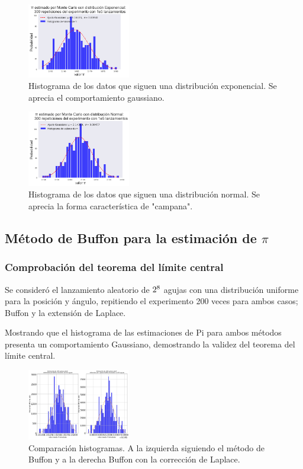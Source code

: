 \documentclass{rbf}
\begin{document}
\begin{figure}[tbp!]
 \centering
  \includegraphics[width=0.4\textwidth]{figures/exp.png}
	\caption{Histograma de los datos que siguen una distribución exponencial. Se aprecia el comportamiento gaussiano.}
 \label{buff8}
\end{figure}
\begin{figure}[h]
 \centering
  \includegraphics[width=0.4\textwidth]{figures/norm.png}
	\caption{Histograma de los datos que siguen una distribución normal. Se aprecia la forma característica de "campana".}
 \label{buff9}
\end{figure}

\subsection{Método de Buffon para la estimación de $\pi$}
\subsubsection{Comprobación del teorema del límite central}

Se consideró el lanzamiento aleatorio de $2 \time 10^8$ agujas con una distribución uniforme para la posición y ángulo, repitiendo el experimento 200 veces para ambos casos; Buffon y la extensión de Laplace.

Mostrando que el histograma de las estimaciones de Pi para ambos métodos presenta un comportamiento Gaussiano, demostrando la validez del teorema del límite central.

\begin{figure}[h]
 \centering
  \includegraphics[width=0.4\textwidth]{figures/lap.jpg}
	\caption{Comparación histogramas. A la izquierda siguiendo el método de Buffon y a la derecha Buffon con la corrección de Laplace.}
 \label{buff10}
\end{figure}
\end{document}
